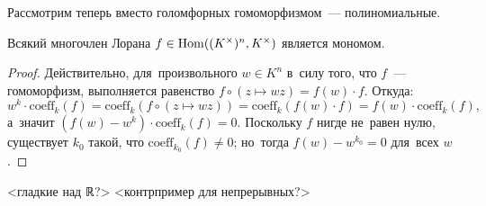 \documentclass{article}
\begin{document}
Рассмотрим теперь вместо голомфорных гомоморфизмом~— полиномиальные.
\begin{lemma*}
    Всякий многочлен Лорана $f \in \mathrm{Hom}((K^\times)^n, K^\times)$ является мономом.
\end{lemma*}

\begin{proof}
    Действительно, для~произвольного $w \in K^n$ в~силу того, что $f$~— гомоморфизм,
    выполняется равенство $f \circ (z \mapsto wz) = f(w) \cdot f$. Откуда:
    $$
        w^k \cdot \mathrm{coeff}_k(f) = \mathrm{coeff}_k(f \circ (z \mapsto wz)) = \mathrm{coeff}_k(f(w) \cdot f) = f(w) \cdot \mathrm{coeff}_k(f),
    $$
    а~значит $(f(w) - w^k) \cdot \mathrm{coeff}_k(f) = 0$.
    Поскольку $f$ нигде не~равен нулю, существует $k_0$ такой, что $\mathrm{coeff}_{k_0}(f) \neq 0$;
    но~тогда $f(w) - w^{k_0} = 0$ для~всех $w$.
\end{proof}

<гладкие над ℝ?>
<контрпример для непрерывных?>
\end{document}
